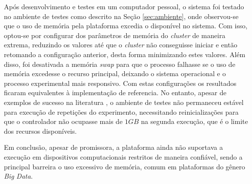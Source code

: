 Após desenvolvimento e testes em um computador pessoal, o sistema foi testado no
ambiente de testes como descrito na Seção \ref{sec:ambiente}, onde observou-se
que o uso de memória pela plataforma \flink excedia o disponível no sistema.
Com isso, optou-se por configurar dos parâmetros de memória do \emph{cluster}
de maneira extrema, reduzindo os valores até que o \emph{cluster} não conseguisse
iniciar e então retomando a configuração anterior, desta forma minimizando estes
valores.
Além disso, foi desativada a memória \emph{swap} para que o processo falhasse se
o uso de memória excedesse o recurso principal, deixando o sistema operacional e
o processo experimental mais responsivo.
Com estas configurações os resultados ficaram equivalentes à implementação de
referencia.
No entanto, apesar de exemplos de sucesso na literatura
\cite{lee2017data,Greco2019wearableStream,battulga2020fogguru}, o ambiente de
testes não permaneceu estável para execução de repetições do experimento,
necessitando reinicializações para que o controlador não ocupasse mais de $1GB$
na segunda execução, que é o limite dos recursos disponíveis.

Em conclusão, apesar de promissora, a plataforma \flink ainda não suportava a
execução em dispositivos computacionais restritos de maneira confiável, sendo a
principal barreira o uso excessivo de memória, comum em plataformas do gênero
\emph{Big Data}.

